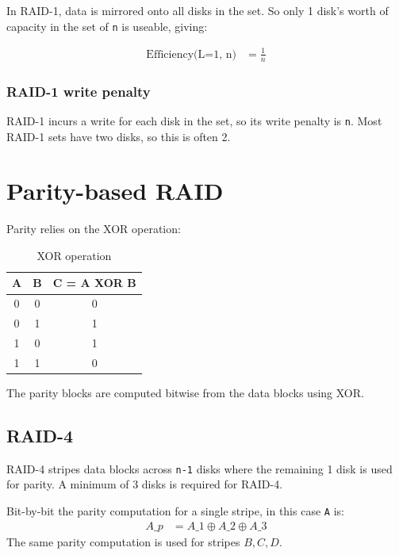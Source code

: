 In RAID-1, data is mirrored onto all disks in the set. So only 1 disk's
worth of capacity in the set of \texttt{n} is useable, giving:

\begin{align}
  \mbox{Efficiency(L=1, n)} & = \frac{1}{n} \label{eq:raid-1-storage-efficiency} 
\end{align}

\subsubsection{RAID-1 write penalty}
\label{sec:raid-1-write-penalty}

RAID-1 incurs a write for each disk in the set, so its write penalty is
\texttt{n}. Most RAID-1 sets have two disks, so this is often 2.

\section{Parity-based RAID}
\label{sec:parity-based-raid}

Parity relies on the XOR operation:

\begin{table}[htbp]
  \begin{tabular}{c c c}
    \toprule
    A & B & C = A XOR B \\
    \midrule
    0 & 0 & 0 \\
    0 & 1 & 1 \\
    1 & 0 & 1 \\
    1 & 1 & 0 \\
    \bottomrule
  \end{tabular}
  \caption{XOR operation}
  \label{tab:xor-operation}
\end{table}

The parity blocks are computed bitwise from the data blocks using XOR.

\subsection{RAID-4}
\label{sec:raid-4}

RAID-4 stripes data blocks across \texttt{n-1} disks where the remaining
1 disk is used for parity. A minimum of 3 disks is required for RAID-4.


Bit-by-bit the parity computation for a single stripe, in this case \texttt{A} is:
\begin{align}
  A\_p & = A\_1 \oplus A\_2 \oplus A\_3 \label{eq:single-stripe-parity}
\end{align}
The same parity computation is used for stripes $B, C, D$.

